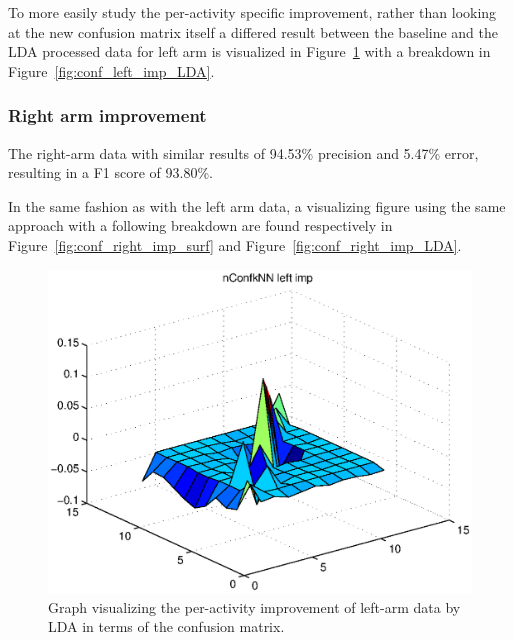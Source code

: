 \documentclass{sig-alternate}
\begin{document}
To more easily study the per-activity specific improvement, rather than looking at the new confusion matrix itself a differed result between the baseline and the LDA processed data for left arm is visualized in Figure~\ref{fig:conf_left_imp_surf} with a breakdown in Figure~\ref{fig:conf_left_imp_LDA}.\\[.5em]

\subsubsection{Right arm improvement}
The right-arm data with similar results of 94.53\% precision and 5.47\% error, resulting in a F1 score of 93.80\%.

In the same fashion as with the left arm data, a visualizing figure using the same approach with a following breakdown are found respectively in Figure~\ref{fig:conf_right_imp_surf} and Figure~\ref{fig:conf_right_imp_LDA}.

\begin{figure}
  \centering
  \includegraphics[scale=0.4]{./matlab_output/nConfkNN_left_imp_LDA_2.eps}
  \caption{Graph visualizing the per-activity improvement of left-arm data by LDA in terms of the confusion matrix.}
  \label{fig:conf_left_imp_surf}
\end{figure}
\end{document}
